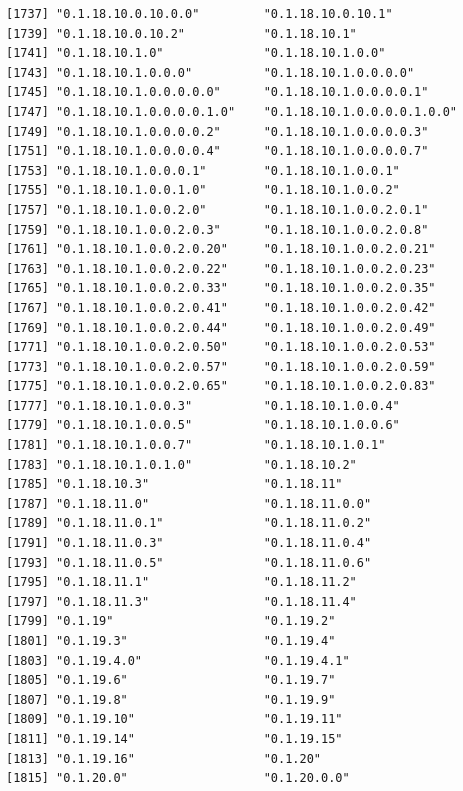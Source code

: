\documentclass[
  letterpaper,
  DIV=11,
  numbers=noendperiod]{scrreprt}
\begin{document}
\begin{verbatim}
[1737] "0.1.18.10.0.10.0.0"         "0.1.18.10.0.10.1"          
[1739] "0.1.18.10.0.10.2"           "0.1.18.10.1"               
[1741] "0.1.18.10.1.0"              "0.1.18.10.1.0.0"           
[1743] "0.1.18.10.1.0.0.0"          "0.1.18.10.1.0.0.0.0"       
[1745] "0.1.18.10.1.0.0.0.0.0"      "0.1.18.10.1.0.0.0.0.1"     
[1747] "0.1.18.10.1.0.0.0.0.1.0"    "0.1.18.10.1.0.0.0.0.1.0.0" 
[1749] "0.1.18.10.1.0.0.0.0.2"      "0.1.18.10.1.0.0.0.0.3"     
[1751] "0.1.18.10.1.0.0.0.0.4"      "0.1.18.10.1.0.0.0.0.7"     
[1753] "0.1.18.10.1.0.0.0.1"        "0.1.18.10.1.0.0.1"         
[1755] "0.1.18.10.1.0.0.1.0"        "0.1.18.10.1.0.0.2"         
[1757] "0.1.18.10.1.0.0.2.0"        "0.1.18.10.1.0.0.2.0.1"     
[1759] "0.1.18.10.1.0.0.2.0.3"      "0.1.18.10.1.0.0.2.0.8"     
[1761] "0.1.18.10.1.0.0.2.0.20"     "0.1.18.10.1.0.0.2.0.21"    
[1763] "0.1.18.10.1.0.0.2.0.22"     "0.1.18.10.1.0.0.2.0.23"    
[1765] "0.1.18.10.1.0.0.2.0.33"     "0.1.18.10.1.0.0.2.0.35"    
[1767] "0.1.18.10.1.0.0.2.0.41"     "0.1.18.10.1.0.0.2.0.42"    
[1769] "0.1.18.10.1.0.0.2.0.44"     "0.1.18.10.1.0.0.2.0.49"    
[1771] "0.1.18.10.1.0.0.2.0.50"     "0.1.18.10.1.0.0.2.0.53"    
[1773] "0.1.18.10.1.0.0.2.0.57"     "0.1.18.10.1.0.0.2.0.59"    
[1775] "0.1.18.10.1.0.0.2.0.65"     "0.1.18.10.1.0.0.2.0.83"    
[1777] "0.1.18.10.1.0.0.3"          "0.1.18.10.1.0.0.4"         
[1779] "0.1.18.10.1.0.0.5"          "0.1.18.10.1.0.0.6"         
[1781] "0.1.18.10.1.0.0.7"          "0.1.18.10.1.0.1"           
[1783] "0.1.18.10.1.0.1.0"          "0.1.18.10.2"               
[1785] "0.1.18.10.3"                "0.1.18.11"                 
[1787] "0.1.18.11.0"                "0.1.18.11.0.0"             
[1789] "0.1.18.11.0.1"              "0.1.18.11.0.2"             
[1791] "0.1.18.11.0.3"              "0.1.18.11.0.4"             
[1793] "0.1.18.11.0.5"              "0.1.18.11.0.6"             
[1795] "0.1.18.11.1"                "0.1.18.11.2"               
[1797] "0.1.18.11.3"                "0.1.18.11.4"               
[1799] "0.1.19"                     "0.1.19.2"                  
[1801] "0.1.19.3"                   "0.1.19.4"                  
[1803] "0.1.19.4.0"                 "0.1.19.4.1"                
[1805] "0.1.19.6"                   "0.1.19.7"                  
[1807] "0.1.19.8"                   "0.1.19.9"                  
[1809] "0.1.19.10"                  "0.1.19.11"                 
[1811] "0.1.19.14"                  "0.1.19.15"                 
[1813] "0.1.19.16"                  "0.1.20"                    
[1815] "0.1.20.0"                   "0.1.20.0.0"                

\end{verbatim}
\end{document}
